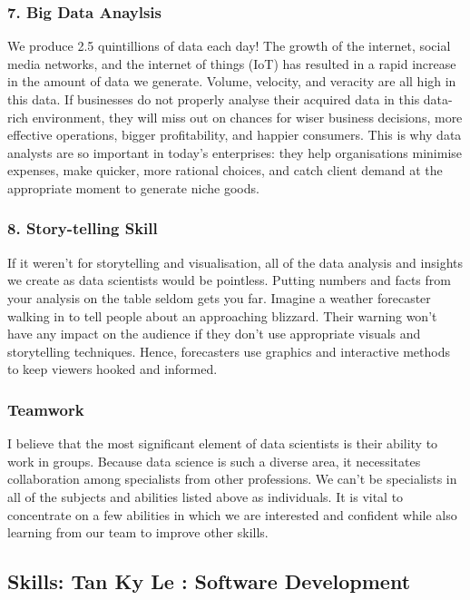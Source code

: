 \documentclass[a4paper, 11pt]{report}
\begin{document}
    \subsubsection{7. Big Data Anaylsis}
    We produce 2.5 quintillions of data each day!\cite{isaac1} The growth of the internet, social media networks, and the internet of things (IoT) has resulted in a rapid increase in the amount of data we generate. Volume, velocity, and veracity are all high in this data.\cite{isaac6} If businesses do not properly analyse their acquired data in this data-rich environment, they will miss out on chances for wiser business decisions, more effective operations, bigger profitability, and happier consumers.\cite{isaac6} This is why data analysts are so important in today's enterprises: they help organisations minimise expenses, make quicker, more rational choices, and catch client demand at the appropriate moment to generate niche goods.\cite{isaac1}

    \subsubsection{8. Story-telling Skill}
    If it weren't for storytelling and visualisation, all of the data analysis and insights we create as data scientists would be pointless. Putting numbers and facts from your analysis on the table seldom gets you far. Imagine a weather forecaster walking in to tell people about an approaching blizzard. Their warning won't have any impact on the audience if they don't use appropriate visuals and storytelling techniques.\cite{isaac7} Hence, forecasters use graphics and interactive methods to keep viewers hooked and informed. \cite{isaac7}

    \subsubsection{Teamwork}
    I believe that the most significant element of data scientists is their ability to work in groups. Because data science is such a diverse area, it necessitates collaboration among specialists from other professions. We can't be specialists in all of the subjects and abilities listed above as individuals. It is vital to concentrate on a few abilities in which we are interested and confident while also learning from our team to improve other skills.

\subsection{Skills: Tan Ky Le : Software Development}
\end{document}
